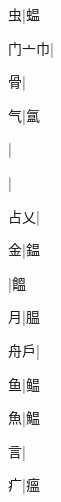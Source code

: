 \begin{multicols}{2}
{{\cjk{}{\cnsym{}　}{\cnsym{}　}虫}|{\cjk{}蝹}\par
{\cjk{}门亠巾}|{}\par
{\cjk{}{\cnsym{}　}{\cnsym{}　}骨}|{}\par
{\cjk{}{\cnsym{}　}{\cnsym{}　}气}|{\cjk{}氲}\par
{}|{}\par
{}|{}\par
{\cjk{}{\cnsym{}　}占乂}|{}\par
{\cjk{}{\cnsym{}　}{\cnsym{}　}金}|{\cjk{}鎾}\par
{}|{\cjk{}饂}\par
{\cjk{}{\cnsym{}　}{\cnsym{}　}月}|{\cjk{}腽}\par
{\cjk{}{\cnsym{}　}舟戶}|{}\par
{\cjk{}{\cnsym{}　}{\cnsym{}　}鱼}|{\cjk{}鳁}\par
{\cjk{}{\cnsym{}　}{\cnsym{}　}魚}|{\cjk{}鰛}\par
{\cjk{}{\cnsym{}　}{\cnsym{}　}言}|{}\par
{\cjk{}{\cnsym{}　}{\cnsym{}　}疒}|{\cjk{}瘟}\par
}
\end{multicols}
